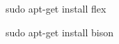 
\begin{DoxyEnumerate}
\item {\ttfamily sudo apt-\/get install flex}
\item {\ttfamily sudo apt-\/get install bison}
\item 
\end{DoxyEnumerate}